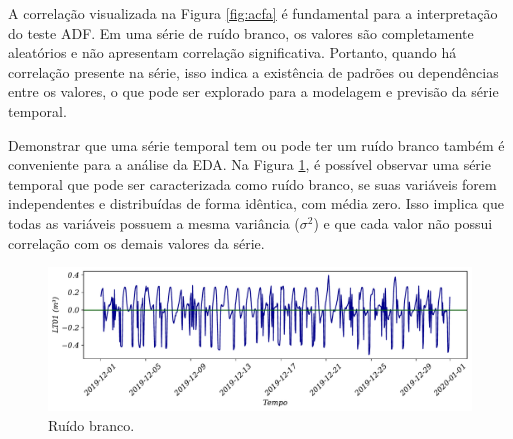 %
%
%

A correlação visualizada na Figura \ref{fig:acfa} é fundamental para a interpretação do teste ADF. Em uma série de ruído branco, os valores são completamente aleatórios e não apresentam correlação significativa. Portanto, quando há correlação presente na série, isso indica a existência de padrões ou dependências entre os valores, o que pode ser explorado para a modelagem e previsão da série temporal.

Demonstrar que uma série temporal tem ou pode ter um ruído branco também é conveniente para a análise da EDA.
Na Figura \ref{fig:ruido-branco}, é possível observar uma série temporal que pode ser caracterizada como ruído branco, se suas variáveis forem independentes e distribuídas de forma idêntica, com média zero. Isso implica que todas as variáveis possuem a mesma variância ($\sigma^2$) e que cada valor não possui correlação com os demais valores da série.

\begin{figure}[!htb]
	\centering
	\caption{Ruído branco.}
	\label{fig:ruido-branco}
	\includegraphics[width=\linewidth]{Resultados/Figuras/ruido-branco}
\end{figure}

